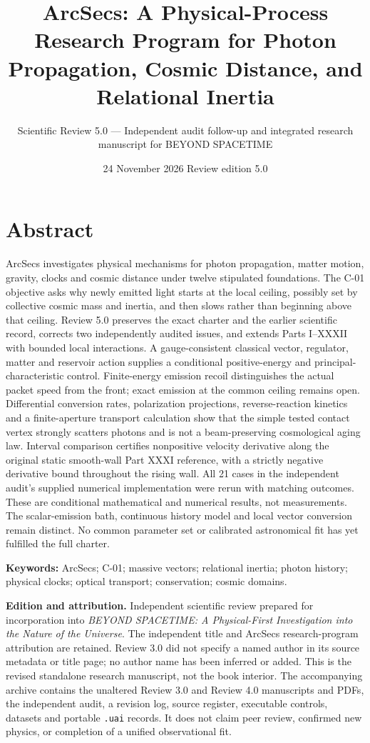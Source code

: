 \documentclass[
  11pt,
  twoside]{article}
\title{ArcSecs: A Physical-Process Research Program for Photon
Propagation, Cosmic Distance, and Relational Inertia}
\subtitle{Scientific Review 5.0 --- Independent audit follow-up and
integrated research manuscript for BEYOND SPACETIME}
\author{}
\date{24 November 2026 \textbar{} Review edition 5.0}
\begin{document}
\maketitle

{
\setcounter{tocdepth}{2}
\tableofcontents
}
\newpage

\section{Abstract}\label{abstract}

ArcSecs investigates physical mechanisms for photon propagation, matter
motion, gravity, clocks and cosmic distance under twelve stipulated
foundations. The C-01 objective asks why newly emitted light starts at
the local ceiling, possibly set by collective cosmic mass and inertia,
and then slows rather than beginning above that ceiling. Review 5.0
preserves the exact charter and the earlier scientific record, corrects
two independently audited issues, and extends Parts I--XXXII with
bounded local interactions. A gauge-consistent classical vector,
regulator, matter and reservoir action supplies a conditional
positive-energy and principal-characteristic control. Finite-energy
emission recoil distinguishes the actual packet speed from the front;
exact emission at the common ceiling remains open. Differential
conversion rates, polarization projections, reverse-reaction kinetics
and a finite-aperture transport calculation show that the simple tested
contact vertex strongly scatters photons and is not a beam-preserving
cosmological aging law. Interval comparison certifies nonpositive
velocity derivative along the original static smooth-wall Part XXXI
reference, with a strictly negative derivative bound throughout the
rising wall. All 21 cases in the independent audit's supplied numerical
implementation were rerun with matching outcomes. These are conditional
mathematical and numerical results, not measurements. The
scalar-emission bath, continuous history model and local vector
conversion remain distinct. No common parameter set or calibrated
astronomical fit has yet fulfilled the full charter.

\textbf{Keywords:} ArcSecs; C-01; massive vectors; relational inertia;
photon history; physical clocks; optical transport; conservation; cosmic
domains.

\textbf{Edition and attribution.} Independent scientific review prepared
for incorporation into \emph{BEYOND SPACETIME: A Physical-First
Investigation into the Nature of the Universe}. The independent title
and ArcSecs research-program attribution are retained. Review 3.0 did
not specify a named author in its source metadata or title page; no
author name has been inferred or added. This is the revised standalone
research manuscript, not the book interior. The accompanying archive
contains the unaltered Review 3.0 and Review 4.0 manuscripts and PDFs,
the independent audit, a revision log, source register, executable
controls, datasets and portable \texttt{.uai} records. It does not claim
peer review, confirmed new physics, or completion of a unified
observational fit.
\end{document}
